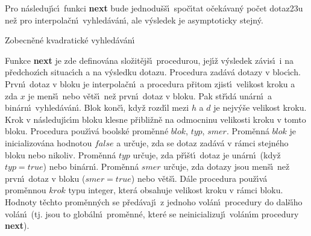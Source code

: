 \flushpar Pro n\'asleduj\'\i c\'\i\ funkci {\bf next} bude 
jednodu\v s\v s\'\i\ spo\v c\'\i tat o\v cek\'ava\-n\'y po\v cet dotaz\accent23u ne\v z 
pro interpola\v cn\'\i\ vyhled\'av\'an\'\i , ale v\'ysledek je 
asymptoticky stejn\'y.

\subhead
Zobecn\v en\'e kvadratick\'e vyhled\'av\'an\'\i
\endsubhead

\flushpar Funkce {\bf next }
je zde definov\'ana slo\v zit\v ej\v s\'\i\ procedurou, jej\'\i\v z v\'y\-sle\-dek 
z\'avis\'\i\ i na p\v redcho\-z\'\i ch situac\'\i ch a na v\'ysledku dotazu.
Procedura zad\'av\'a dotazy v bloc\'\i ch. Prvn\'\i\ dotaz v bloku je 
interpola\v cn\'\i\ a procedura p\v ritom zjist\'\i\ velikost kroku a 
zda $x$ je men\v s\'\i\ nebo v\v et\v s\'\i\ ne\v z prvn\'\i\ dotaz v bloku.  
Pak st\v r\'\i d\'a un\'arn\'\i\ a bin\'arn\'\i\ vy\-hled\'av\'an\'\i . Blok kon\v c\'\i , 
kdy\v z rozd\'\i l mezi $h$ a $d$ je nejv\'y\v se velikost 
kroku. Krok v n\'asleduj\'\i c\'\i m bloku klesne 
p\v ribli\v zn\v e na odmoc\-ninu velikosti kroku v tomto bloku. 
Procedura pou\v z\'\i v\'a boolsk\'e pro\-m\v enn\'e $blok$, $typ$, $
smer$. 
Prom\v enn\'a $blok$ je inicializov\'ana hodnotou $false$ a ur\v cuje, 
zda se dotaz zad\'av\'a v r\'amci stejn\'eho bloku nebo nikoliv. 
Prom\v enn\'a $typ$ ur\v cuje, zda p\v r\'\i\v st\'\i\ dotaz je un\'arn\'\i\ (kdy\v z 
$typ=true$) nebo bin\'arn\'\i . Prom\v enn\'a $smer$ ur\v cuje, zda 
dotazy jsou men\v s\'\i\ ne\v z prvn\'\i\ dotaz v bloku ($smer=tr
ue$) 
nebo v\v et\v s\'\i . D\'ale procedura pou\v z\'\i v\'a prom\v ennou $
krok$ 
typu integer, kter\'a obsahuje velikost kroku v r\'amci 
bloku. Hodnoty t\v echto pro\-m\v en\-n\'ych se p\v red\'avaj\'\i\ z jednoho 
vol\'an\'\i\ procedury do dal\v s\'\i ho vol\'an\'\i\ (tj. jsou to 
glob\'aln\'\i\ prom\v enn\'e, kter\'e se neinicializuj\'\i\ vol\'an\'\i m 
procedury {\bf next}). 
\medskip

